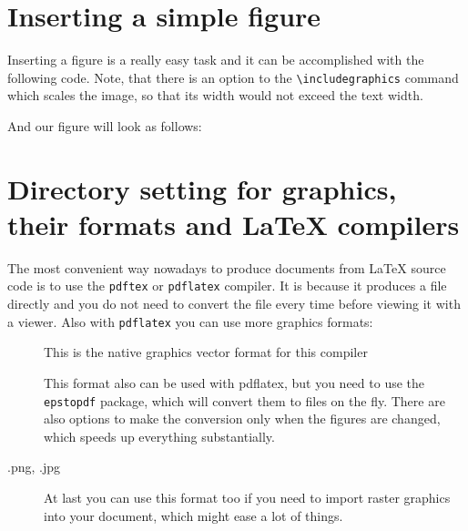\documentclass[
]{scrartcl}
\begin{document}
\clearpage
\section{Inserting a simple figure}

%
Inserting a figure is a really easy task and it can be accomplished with the
    following code. 
%
Note, that there is an option to the \verb|\includegraphics| command which
    scales the image, so that its width would not exceed the text width.
%

%
And our figure will look as follows:
%


\clearpage
\section{Directory setting for graphics, their formats and \LaTeX{} compilers}

%
The most convenient way nowadays to produce documents from \LaTeX{} source code
    is to use the \verb|pdftex| or \verb|pdflatex| compiler. 
%
It is because it produces a  file directly and you do not need to
    convert the  file every time before viewing it with a viewer.
%
Also with \verb|pdflatex| you can use more graphics formats:
%
\begin{description}
    \item[] This is the native graphics vector format for this compiler
    \item[] This format also can be used with pdflatex, but you need to use
        the \verb|epstopdf| package, which will convert them to
         files on the fly. There are also options to make the
        conversion only when the  figures are changed, which speeds
        up everything
        substantially.
    \item[.png, .jpg] At last you can use this format too if you need to import
        raster graphics into your document, which might ease a lot of things.
\end{description}
\end{document}
